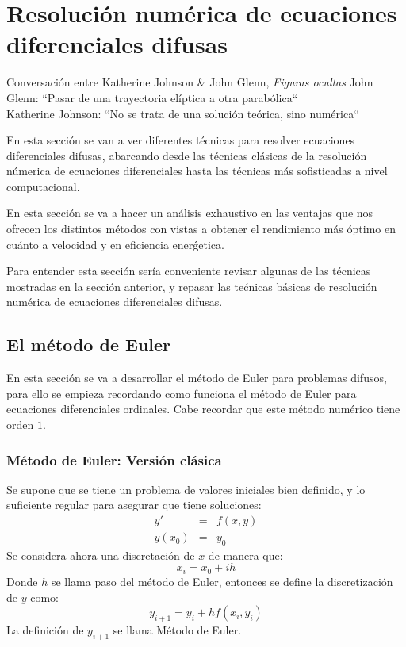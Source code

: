 \chapter{Resolución numérica de ecuaciones diferenciales difusas}
\begin{chapquote}{Conversación entre Katherine Johnson \& John Glenn, \textit{Figuras ocultas}}
	John Glenn: ``Pasar de una trayectoria elíptica a otra parabólica`` \\
	Katherine Johnson: ``No se trata de una solución teórica, sino numérica`` \cite{eulernasa}
\end{chapquote}

En esta sección se van a ver diferentes técnicas para resolver ecuaciones diferenciales difusas, abarcando desde las técnicas clásicas de la resolución númerica de ecuaciones diferenciales hasta las técnicas más sofisticadas a nivel computacional.

En esta sección se va a hacer un análisis exhaustivo en las ventajas que nos ofrecen los distintos métodos con vistas a obtener el rendimiento más óptimo en cuánto a velocidad y en eficiencia enerǵetica.

Para entender esta sección sería conveniente revisar algunas de las técnicas mostradas en la sección anterior, y repasar las tećnicas básicas de resolución numérica de ecuaciones diferenciales difusas.

\section{El método de Euler}
En esta sección se va a desarrollar el método de Euler para problemas difusos, para ello se empieza recordando como funciona el método de Euler para ecuaciones diferenciales ordinales. Cabe recordar que este método numérico tiene orden $1$.

\subsection{Método de Euler: Versión clásica}
Se supone que se tiene un problema de valores iniciales bien definido, y lo suficiente regular para asegurar que tiene soluciones:
\[
\begin{array}{ccc}
	y' & = &f(x, y)  \\
	y(x_0) & = & y_0
\end{array}
\]
Se considera ahora una discretación de $x$ de manera que:
\[
	x_i = x_0 + i h
\]
Donde $h$ se llama paso del método de Euler, entonces se define la discretización de $y$ como:
\[
	y_{i+1} = y_i + h f(x_i, y_i)
\]
La definición de $y_{i+1}$ se llama Método de Euler.

